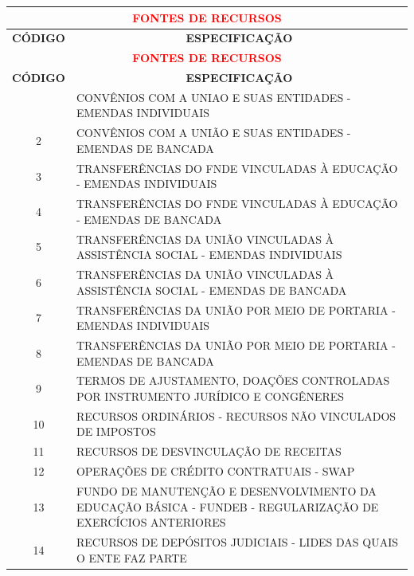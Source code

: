 \documentclass{article}
\begin{document}
\noindent\begin{longtable}[c]{m{1cm}|m{11cm}}
\multicolumn{2}{c}{\cellcolor{gray!50} \textcolor{red} {\normalsize \textbf{FONTES DE RECURSOS}}}\Tstrut  \\[2ex]
\hline\hline
\multicolumn{1}{c|}{\textbf{CÓDIGO}} & \multicolumn{1}{c}{\textbf{ESPECIFICAÇÃO}} \\
\hline
\endfirsthead
\multicolumn{2}{c}{\cellcolor{gray!50} \textcolor{red} {\normalsize \textbf{FONTES DE RECURSOS}}}\Tstrut  \\[2ex]
\hline\hline
\multicolumn{1}{c|}{\textbf{CÓDIGO}} & \multicolumn{1}{c}{\textbf{ESPECIFICAÇÃO}} \\
\hline
\endhead
\endfoot
\hline\hline\hline
\endlastfoot
\multicolumn{1}{c|}{ 1 } & CONVÊNIOS COM A UNIAO E SUAS ENTIDADES - EMENDAS INDIVIDUAIS \\
\multicolumn{1}{c|}{ 2 } & CONVÊNIOS COM A UNIÃO E SUAS ENTIDADES - EMENDAS DE BANCADA \\
\multicolumn{1}{c|}{ 3 } & TRANSFERÊNCIAS DO FNDE VINCULADAS À EDUCAÇÃO - EMENDAS INDIVIDUAIS \\
\multicolumn{1}{c|}{ 4 } & TRANSFERÊNCIAS DO FNDE VINCULADAS À EDUCAÇÃO - EMENDAS DE BANCADA \\
\multicolumn{1}{c|}{ 5 } & TRANSFERÊNCIAS DA UNIÃO VINCULADAS À ASSISTÊNCIA SOCIAL - EMENDAS INDIVIDUAIS \\
\multicolumn{1}{c|}{ 6 } & TRANSFERÊNCIAS DA UNIÃO VINCULADAS À ASSISTÊNCIA SOCIAL - EMENDAS DE BANCADA \\
\multicolumn{1}{c|}{ 7 } & TRANSFERÊNCIAS DA UNIÃO POR MEIO DE PORTARIA - EMENDAS INDIVIDUAIS \\
\multicolumn{1}{c|}{ 8 } & TRANSFERÊNCIAS DA UNIÃO POR MEIO DE PORTARIA - EMENDAS DE BANCADA \\
\multicolumn{1}{c|}{ 9 } & TERMOS DE AJUSTAMENTO, DOAÇÕES CONTROLADAS POR INSTRUMENTO JURÍDICO E CONGÊNERES \\
\multicolumn{1}{c|}{ 10 } & RECURSOS ORDINÁRIOS - RECURSOS NÃO VINCULADOS DE IMPOSTOS \\
\multicolumn{1}{c|}{ 11 } & RECURSOS DE DESVINCULAÇÃO DE RECEITAS \\
\multicolumn{1}{c|}{ 12 } & OPERAÇÕES DE CRÉDITO CONTRATUAIS - SWAP \\
\multicolumn{1}{c|}{ 13 } & FUNDO DE MANUTENÇÃO E DESENVOLVIMENTO DA EDUCAÇÃO BÁSICA - FUNDEB - REGULARIZAÇÃO DE EXERCÍCIOS ANTERIORES \\
\multicolumn{1}{c|}{ 14 } & RECURSOS DE DEPÓSITOS JUDICIAIS - LIDES DAS QUAIS O ENTE FAZ PARTE \\

\end{longtable}
\end{document}

